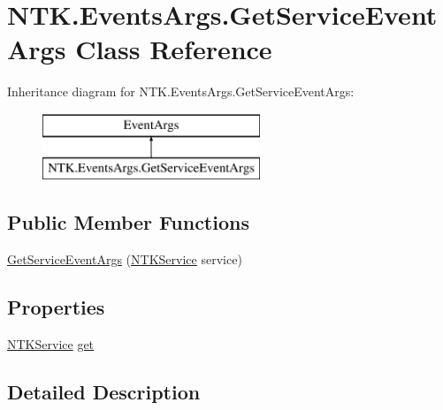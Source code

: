 \hypertarget{class_n_t_k_1_1_events_args_1_1_get_service_event_args}{}\section{N\+T\+K.\+Events\+Args.\+Get\+Service\+Event\+Args Class Reference}
\label{class_n_t_k_1_1_events_args_1_1_get_service_event_args}
Inheritance diagram for N\+T\+K.\+Events\+Args.\+Get\+Service\+Event\+Args\+:\begin{figure}[H]
\begin{center}
\leavevmode
\includegraphics[height=2.000000cm]{d5/d0c/class_n_t_k_1_1_events_args_1_1_get_service_event_args}
\end{center}
\end{figure}
\subsection*{Public Member Functions}
\begin{DoxyCompactItemize}
\item 
\mbox{\hyperlink{class_n_t_k_1_1_events_args_1_1_get_service_event_args_a72494743334dc798efd1278b657c2bf3}{Get\+Service\+Event\+Args}} (\mbox{\hyperlink{class_n_t_k_1_1_service_1_1_n_t_k_service}{N\+T\+K\+Service}} service)
\end{DoxyCompactItemize}
\subsection*{Properties}
\begin{DoxyCompactItemize}
\item 
\mbox{\hyperlink{class_n_t_k_1_1_service_1_1_n_t_k_service}{N\+T\+K\+Service}} \mbox{\hyperlink{class_n_t_k_1_1_events_args_1_1_get_service_event_args_aad50726dafa000bb725f2fe277c26a29}{get}}
\end{DoxyCompactItemize}


\subsection{Detailed Description}


